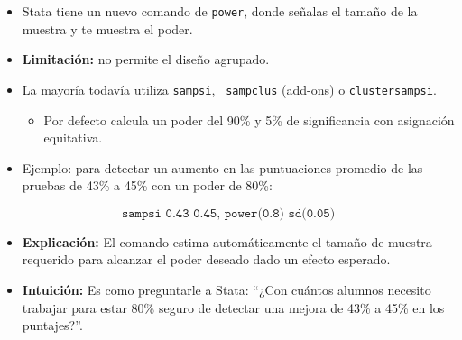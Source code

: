 \documentclass[12pt]{article}
\begin{document}
\begin{itemize}
    \item Stata tiene un nuevo comando de \texttt{power}, donde señalas el tamaño de la muestra y te muestra el poder. 
    \item \textbf{Limitación:} no permite el diseño agrupado.
    \item La mayoría todavía utiliza \texttt{sampsi}, \texttt{ sampclus} (add-ons) o \texttt{clustersampsi}.
    \begin{itemize}
        \item Por defecto calcula un poder del 90\% y 5\% de significancia con asignación equitativa.
    \end{itemize}
    \item Ejemplo: para detectar un aumento en las puntuaciones promedio de las pruebas de 43\% a 45\% con un poder de 80\%:
\end{itemize}

\[
\texttt{sampsi 0.43 0.45, power(0.8) sd(0.05)}
\]

\begin{itemize}
    \item \textbf{Explicación:} El comando estima automáticamente el tamaño de muestra requerido para alcanzar el poder deseado dado un efecto esperado.
    \item \textbf{Intuición:} Es como preguntarle a Stata: “¿Con cuántos alumnos necesito trabajar para estar 80\% seguro de detectar una mejora de 43\% a 45\% en los puntajes?”.
\end{itemize}
\end{document}
